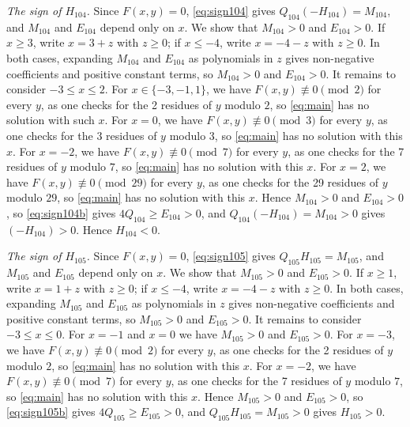 \documentclass[11pt]{article}
\begin{document}
\emph{The sign of $H_{104}$.} Since $F(x,y)=0$, \eqref{eq:sign104} gives $Q_{104}(-H_{104})=M_{104}$, and $M_{104}$ and $E_{104}$ depend only on $x$. We show that $M_{104}>0$ and $E_{104}>0$. If $x\geq3$, write $x=3+z$ with $z\geq0$; if $x\leq-4$, write $x=-4-z$ with $z\geq0$. In both cases, expanding $M_{104}$ and $E_{104}$ as polynomials in $z$ gives non-negative coefficients and positive constant terms, so $M_{104}>0$ and $E_{104}>0$. It remains to consider $-3\leq x\leq2$. For $x\in\{-3,\allowbreak -1,\allowbreak 1\}$, we have $F(x,y)\not\equiv0\pmod{2}$ for every $y$, as one checks for the 2 residues of $y$ modulo $2$, so \eqref{eq:main} has no solution with such $x$. For $x=0$, we have $F(x,y)\not\equiv0\pmod{3}$ for every $y$, as one checks for the 3 residues of $y$ modulo $3$, so \eqref{eq:main} has no solution with this $x$. For $x=-2$, we have $F(x,y)\not\equiv0\pmod{7}$ for every $y$, as one checks for the 7 residues of $y$ modulo $7$, so \eqref{eq:main} has no solution with this $x$. For $x=2$, we have $F(x,y)\not\equiv0\pmod{29}$ for every $y$, as one checks for the 29 residues of $y$ modulo $29$, so \eqref{eq:main} has no solution with this $x$. Hence $M_{104}>0$ and $E_{104}>0$, so \eqref{eq:sign104b} gives $4Q_{104}\geq E_{104}>0$, and $Q_{104}(-H_{104})=M_{104}>0$ gives $(-H_{104})>0$. Hence $H_{104}<0$.

\emph{The sign of $H_{105}$.} Since $F(x,y)=0$, \eqref{eq:sign105} gives $Q_{105}H_{105}=M_{105}$, and $M_{105}$ and $E_{105}$ depend only on $x$. We show that $M_{105}>0$ and $E_{105}>0$. If $x\geq1$, write $x=1+z$ with $z\geq0$; if $x\leq-4$, write $x=-4-z$ with $z\geq0$. In both cases, expanding $M_{105}$ and $E_{105}$ as polynomials in $z$ gives non-negative coefficients and positive constant terms, so $M_{105}>0$ and $E_{105}>0$. It remains to consider $-3\leq x\leq0$. For $x=-1$ and $x=0$ we have $M_{105}>0$ and $E_{105}>0$. For $x=-3$, we have $F(x,y)\not\equiv0\pmod{2}$ for every $y$, as one checks for the 2 residues of $y$ modulo $2$, so \eqref{eq:main} has no solution with this $x$. For $x=-2$, we have $F(x,y)\not\equiv0\pmod{7}$ for every $y$, as one checks for the 7 residues of $y$ modulo $7$, so \eqref{eq:main} has no solution with this $x$. Hence $M_{105}>0$ and $E_{105}>0$, so \eqref{eq:sign105b} gives $4Q_{105}\geq E_{105}>0$, and $Q_{105}H_{105}=M_{105}>0$ gives $H_{105}>0$.
\end{document}
